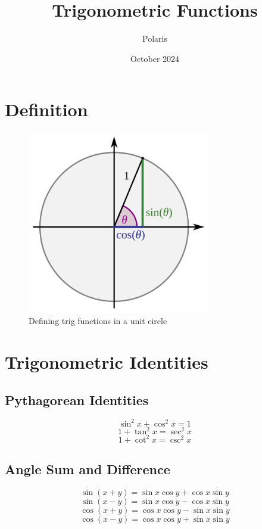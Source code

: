 \documentclass{article}
\title{Trigonometric Functions}
\author{Polaris}
\date{October 2024}
\begin{document}
 

\maketitle

\section{Definition}
\begin{figure}[H]
    \centering
    \includegraphics[width = 8cm]{pictures/trig.png}
    \caption{Defining trig functions in a unit circle}
\end{figure}


\section{Trigonometric Identities}
\subsection{Pythagorean Identities}
\begin{equation}
    \sin^2 x + \cos^2 x =1
\end{equation}
\begin{equation}
    1 + \tan^2 x = \sec^2 x
\end{equation}
\begin{equation}
    1 + \cot^2 x = \csc^2 x
\end{equation}

\subsection{Angle Sum and Difference}
\begin{equation}
    \sin(x+y) = \sin x \cos y + \cos x \sin y
\end{equation}
\begin{equation}
    \sin(x-y) = \sin x \cos y - \cos x \sin y
\end{equation}
\begin{equation}
    \cos(x+y) = \cos x \cos y - \sin x \sin y
\end{equation}
\begin{equation}
    \cos(x-y) = \cos x \cos y + \sin x \sin y
\end{equation}
\end{document}
